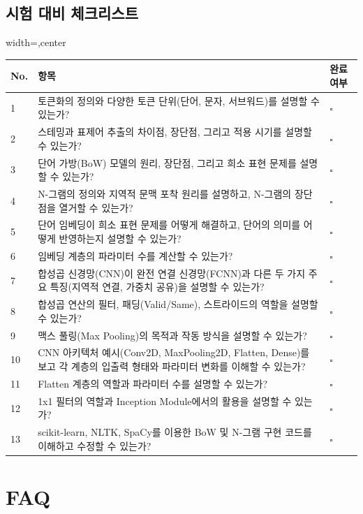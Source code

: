 \documentclass[11pt,a4paper]{article}
\begin{document}
\subsection{시험 대비 체크리스트}
\begin{adjustbox}{width=\textwidth,center}
\begin{tabular}{p{0.5cm}p{10cm}p{2cm}}
\toprule
\textbf{No.} & \textbf{항목} & \textbf{완료 여부} \\
\midrule
1 & 토큰화의 정의와 다양한 토큰 단위(단어, 문자, 서브워드)를 설명할 수 있는가? & \quad $\square$ \\
2 & 스테밍과 표제어 추출의 차이점, 장단점, 그리고 적용 시기를 설명할 수 있는가? & \quad $\square$ \\
3 & 단어 가방(BoW) 모델의 원리, 장단점, 그리고 희소 표현 문제를 설명할 수 있는가? & \quad $\square$ \\
4 & N-그램의 정의와 지역적 문맥 포착 원리를 설명하고, N-그램의 장단점을 열거할 수 있는가? & \quad $\square$ \\
5 & 단어 임베딩이 희소 표현 문제를 어떻게 해결하고, 단어의 의미를 어떻게 반영하는지 설명할 수 있는가? & \quad $\square$ \\
6 & 임베딩 계층의 파라미터 수를 계산할 수 있는가? & \quad $\square$ \\
7 & 합성곱 신경망(CNN)이 완전 연결 신경망(FCNN)과 다른 두 가지 주요 특징(지역적 연결, 가중치 공유)을 설명할 수 있는가? & \quad $\square$ \\
8 & 합성곱 연산의 필터, 패딩(Valid/Same), 스트라이드의 역할을 설명할 수 있는가? & \quad $\square$ \\
9 & 맥스 풀링(Max Pooling)의 목적과 작동 방식을 설명할 수 있는가? & \quad $\square$ \\
10 & CNN 아키텍처 예시(Conv2D, MaxPooling2D, Flatten, Dense)를 보고 각 계층의 입출력 형태와 파라미터 변화를 이해할 수 있는가? & \quad $\square$ \\
11 & Flatten 계층의 역할과 파라미터 수를 설명할 수 있는가? & \quad $\square$ \\
12 & 1x1 필터의 역할과 Inception Module에서의 활용을 설명할 수 있는가? & \quad $\square$ \\
13 & scikit-learn, NLTK, SpaCy를 이용한 BoW 및 N-그램 구현 코드를 이해하고 수정할 수 있는가? & \quad $\square$ \\
\bottomrule
\end{tabular}
\end{adjustbox}

\newpage
\section{FAQ}
\end{document}
